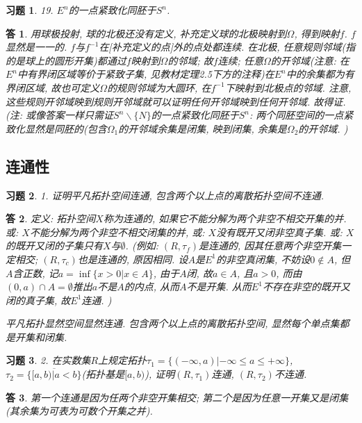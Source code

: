\documentclass{ctexart}%
\newtheorem*{exercise}{习题}
\newtheorem*{solution}{答}
\theoremstyle{definition}
\theoremstyle{remark}
\begin{document}
\begin{exercise}19. $E^n$的一点紧致化同胚于$S^n$.
\end{exercise}
\begin{solution}
用球极投射, 球的北极还没有定义, 补充定义球的北极映射到$\Omega$, 得到映射$f$. $f$显然是一一的. $f$与$f^{-1}$在[补充定义的点]外的点处都连续. 在北极, 任意规则邻域(指的是球上的圆形开集)都通过$f$映射到$\Omega$的邻域; 故$f$连续; 任意$\Omega$的开邻域(注意: 在$E^n$中有界闭区域等价于紧致子集, 见教材定理2.5下方的注释)在$E^n$中的余集都为有界闭区域, 故也可定义$\Omega$的规则邻域为大圆环, 在$f^{-1}$下映射到北极点的邻域. 注意, 这些规则开邻域映到规则开邻域就可以证明任何开邻域映到任何开邻域. 故得证.  (注: 或像答案一样只需证$S^n\backslash\{N\}$的一点紧致化同胚于$S^n$: 两个同胚空间的一点紧致化显然是同胚的(包含$\Omega_1$的开邻域余集是闭集, 映到闭集, 余集是$\Omega_2$的开邻域. )
\end{solution}

\subsection{连通性}


\begin{exercise}1. 证明平凡拓扑空间连通, 包含两个以上点的离散拓扑空间不连通.
\end{exercise}
\begin{solution}
定义: 拓扑空间$X$称为连通的, 如果它不能分解为两个非空不相交开集的并. 或: $X$不能分解为两个非空不相交闭集的并, 或: $X$没有既开又闭非空真子集. 或: $X$的既开又闭的子集只有$X$与$\emptyset$. (例如: $(R,\tau_f)$是连通的, 因其任意两个非空开集一定相交; $(R,\tau_c)$也是连通的, 原因相同. 设$A$是$E^1$的非空真闭集, 不妨设$0\notin A$, 但$A$含正数, 记$a=\inf\{x>0|x\in A\}$, 由于$A$闭, 故$a\in A$, 且$a>0$, 而由$(0,a)\cap A=\emptyset$推出$a$不是$A$的内点, 从而$A$不是开集. 从而$E^1$不存在非空的既开又闭的真子集, 故$E^1$连通. )

平凡拓扑显然空间显然连通. 包含两个以上点的离散拓扑空间, 显然每个单点集都是开集和闭集. 
\end{solution}

\begin{exercise}2. 在实数集$R$上规定拓扑$\tau_1=\{(-\infty,a)|-\infty\leq a\leq +\infty\}$, $\tau_2
=\overline{{\{[a,b)|a<b\}}}$(拓扑基是$[a,b)$), 证明$(R,\tau_1)$连通, $(R,\tau_2)$不连通.
\end{exercise}
\begin{solution}
第一个连通是因为任两个非空开集相交; 第二个是因为任意一开集又是闭集(其余集为可表为可数个开集之并).
\end{solution}
\end{document}

